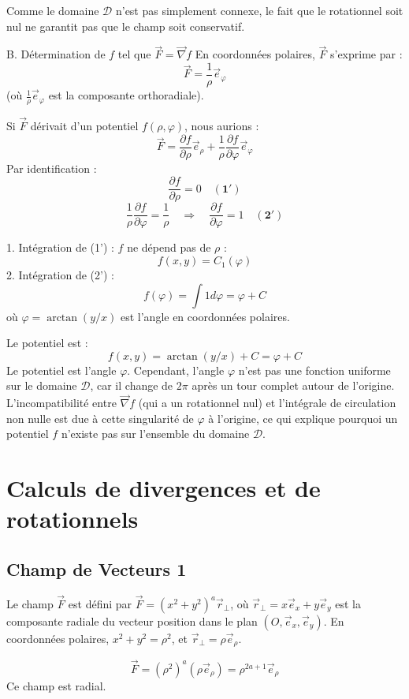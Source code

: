 \documentclass[french]{yLectureNote}
\renewcommand{\vec}{\overrightarrow}
\begin{document}
Comme le domaine $\mathcal{D}$  n'est pas simplement connexe, le fait que le rotationnel soit nul ne garantit pas que le champ soit conservatif.

B. Détermination de $f$ tel que $\vec{F} = \vec{\nabla}f$
En coordonnées polaires, $\vec{F}$ s'exprime par :
$$
\vec{F} = \frac{1}{\rho}\vec{e}_{\varphi}
$$
(où $\frac{1}{\rho} \vec{e}_{\varphi}$ est la composante orthoradiale).

Si $\vec{F}$ dérivait d'un potentiel $f(\rho, \varphi)$, nous aurions :
$$
\vec{F} = \frac{\partial f}{\partial\rho}\vec{e}_{\rho}+\frac{1}{\rho}\frac{\partial f}{\partial\varphi}\vec{e}_{\varphi}
$$
Par identification :
$$
\frac{\partial f}{\partial\rho} = 0 \quad \mathbf{(1')}
$$
$$
\frac{1}{\rho}\frac{\partial f}{\partial\varphi} = \frac{1}{\rho} \quad \Rightarrow \quad \frac{\partial f}{\partial\varphi} = 1 \quad \mathbf{(2')}
$$

1.  Intégration de (1') : $f$ ne dépend pas de $\rho$ :
    $$
    f(x,y) = C_1(\varphi)
    $$
2.  Intégration de (2') :
    $$
    f(\varphi) = \int 1 d\varphi = \varphi + C
    $$
    où $\varphi = \arctan(y/x)$ est l'angle en coordonnées polaires.

Le potentiel est :
$$
f(x,y) = \arctan(y/x) + C = \varphi + C
$$
Le potentiel est l'angle $\varphi$. Cependant, l'angle $\varphi$ n'est pas une fonction uniforme sur le domaine $\mathcal{D}$, car il change de $2\pi$ après un tour complet autour de l'origine. L'incompatibilité entre $\vec{\nabla}f$ (qui a un rotationnel nul) et l'intégrale de circulation non nulle est due à cette singularité de $\varphi$ à l'origine, ce qui explique pourquoi un potentiel $f$ n'existe pas sur l'ensemble du domaine $\mathcal{D}$.
\section{Calculs de divergences et de rotationnels}
\subsection{Champ de Vecteurs 1}

Le champ $\vec{F}$ est défini par $\vec{F} = (x^2+y^2)^a \vec{r}_{\perp}$, où $\vec{r}_{\perp} = x\vec{e}_{x}+y\vec{e}_{y}$ est la composante radiale du vecteur position dans le plan $(O, \vec{e}_x, \vec{e}_y)$. En coordonnées polaires, $x^2+y^2 = \rho^2$, et $\vec{r}_{\perp} = \rho \vec{e}_{\rho}$.

$$
\vec{F} = (\rho^2)^a (\rho \vec{e}_{\rho}) = \rho^{2a+1} \vec{e}_{\rho}
$$
Ce champ est  radial.
\end{document}
